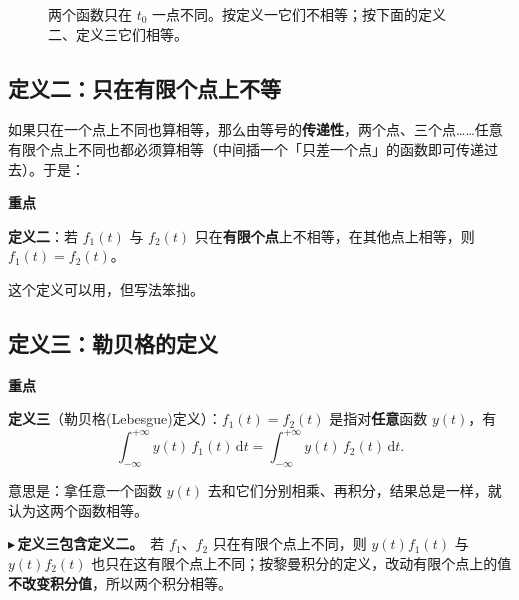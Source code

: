 \documentclass[UTF8,a4paper,11pt]{ctexart}
\newenvironment{remember}{\begin{rememberbox}\textbf{重点}\par\smallskip}{\end{rememberbox}}
\newcommand{\taxes}[4][t]{%
  \draw[->] (#2,0) -- (#3,0) node[right,font=\scriptsize] {$#1$};
  \draw[->] (0,-0.3) -- (0,#4);
  \node[anchor=north east,font=\tiny,gray!60!black,inner sep=1pt] at (0,-0.02) {$0$};}
\newcommand{\xt}[2]{\draw (#1,0) -- (#1,-0.1) node[anchor=north,font=\tiny,gray!60!black,fill=white,inner sep=0.6pt] {$#2$};}
\newcommand{\yt}[2]{\draw (0,#1) -- (-0.1,#1) node[anchor=east,font=\tiny,gray!60!black,fill=white,inner sep=0.6pt] {$#2$};}
\newcounter{ex}[section]
\newcommand{\point}[1]{\par\addvspace{1ex}\noindent\textcolor{ptteal}{$\blacktriangleright$\,\textbf{#1}}\ }
\begin{document}
\begin{figure}[H]
\centering
{}
\caption{两个函数只在 $t_0$ 一点不同。按定义一它们不相等；按下面的定义二、定义三它们相等。}
\end{figure}

\subsection{定义二：只在有限个点上不等}
如果只在一个点上不同也算相等，那么由等号的\textbf{传递性}，两个点、三个点……任意有限个点上不同也都必须算相等（中间插一个「只差一个点」的函数即可传递过去）。于是：

\begin{remember}
\textbf{定义二}：若 $f_1(t)$ 与 $f_2(t)$ 只在\textbf{有限个点}上不相等，在其他点上相等，则 $f_1(t)=f_2(t)$。
\end{remember}
这个定义可以用，但写法笨拙。

\subsection{定义三：勒贝格的定义}
\begin{remember}
\textbf{定义三}（勒贝格(Lebesgue)定义）：$f_1(t)=f_2(t)$ 是指对\textbf{任意}函数 $y(t)$，有
\[
\int_{-\infty}^{+\infty}y(t)\,f_1(t)\,\mathrm{d}t=\int_{-\infty}^{+\infty}y(t)\,f_2(t)\,\mathrm{d}t .
\]
\end{remember}
意思是：拿任意一个函数 $y(t)$ 去和它们分别相乘、再积分，结果总是一样，就认为这两个函数相等。

\point{定义三包含定义二。}若 $f_1$、$f_2$ 只在有限个点上不同，则 $y(t)f_1(t)$ 与 $y(t)f_2(t)$ 也只在这有限个点上不同；按黎曼积分的定义，改动有限个点上的值\textbf{不改变积分值}，所以两个积分相等。
\end{document}
